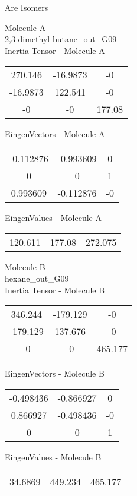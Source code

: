 \begin{center}
\vtab
\vtab
\textcolor{NavyBlue}{\Large Are Isomers}
\end{center}
\newpage
\begin{multicols}{2}
\begin{center}
Molecule A \\ 
2,3-dimethyl-butane\_out\_G09
\\
Inertia Tensor - Molecule A \\
\vtab
\begin{tabular}{|c c c|}
270.146	 & 	-16.9873	 & 	-0	 \\
-16.9873	 & 	122.541	 & 	-0	 \\
-0	 & 	-0	 & 	177.08
\end{tabular}

\vtab
 EingenVectors - Molecule A     \\
\vtab
\begin{tabular}{|c c c|}
-0.112876	 & 	-0.993609	 & 	0	 \\
0	 & 	0	 & 	1	 \\
0.993609	 & 	-0.112876	 & 	-0
\end{tabular}

\vtab
 EingenValues - Molecule A     \\
\vtab
\begin{tabular}{|c c c|}
120.611	 & 	177.08	 & 	272.075
\end{tabular}
\columnbreak

Molecule B \\ 
hexane\_out\_G09
\\
Inertia Tensor - Molecule B \\
\vtab
\begin{tabular}{|c c c|}
346.244	 & 	-179.129	 & 	-0	 \\
-179.129	 & 	137.676	 & 	-0	 \\
-0	 & 	-0	 & 	465.177
\end{tabular}

\vtab
 EingenVectors - Molecule B     \\
\vtab
\begin{tabular}{|c c c|}
-0.498436	 & 	-0.866927	 & 	0	 \\
0.866927	 & 	-0.498436	 & 	-0	 \\
0	 & 	0	 & 	1
\end{tabular}

\vtab
 EingenValues - Molecule B     \\
\vtab
\begin{tabular}{|c c c|}
34.6869	 & 	449.234	 & 	465.177
\end{tabular}

\end{center}
\end{multicols}
